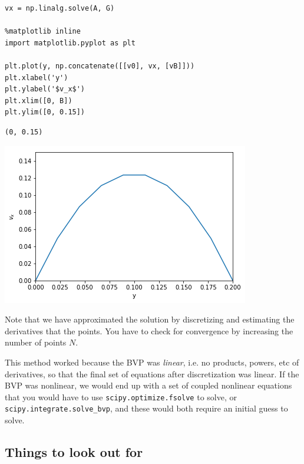 \documentclass[11pt]{article}
\begin{document}
\begin{verbatim}
vx = np.linalg.solve(A, G)

%matplotlib inline
import matplotlib.pyplot as plt

plt.plot(y, np.concatenate([[v0], vx, [vB]]))
plt.xlabel('y')
plt.ylabel('$v_x$')
plt.xlim([0, B])
plt.ylim([0, 0.15])
\end{verbatim}

\begin{verbatim}
(0, 0.15)
\end{verbatim}



\begin{center}
\includegraphics[width=.9\linewidth]{obipy-resources/b5b04848a67295fc27e39527fe8a7f38-35028OsN.png}
\end{center}


Note that we have approximated the solution by discretizing and estimating the derivatives that the points. You have to check for convergence by increasing the number of points \(N\).

This method worked because the BVP was \emph{linear}, i.e. no products, powers, etc of derivatives, so that the final set of equations after discretization was linear. If the BVP was nonlinear, we would end up with a set of coupled nonlinear equations that you would have to use \texttt{scipy.optimize.fsolve} to solve, or \texttt{scipy.integrate.solve\_bvp}, and these would both require an initial guess to solve.

\subsection{Things to look out for}
\label{sec:org53ee38b}
\end{document}
